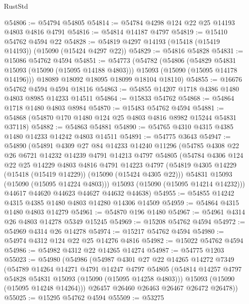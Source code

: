 \begin{lexlean}{RustStd}
\begin{coremodule}
@54806 := @54794 @54805
@54814 := @54784 @4298 @124 @22 @25 @14193 @4803 @4816 @4791
@54816 := @54814 @14187 @4797
@54819 := @15410 @54762 @4594 @22
@54828 := @54819 @4297 @14193 (@15418 (@15419 @14193)) (@15090 (@15424 @4297 @22))
@54829 := @54816 @54828
@54831 := @15086 @54762 @4594
@54851 := @54773
    (@54782
      (@54806
        (@54829 @54831 @15093 (@15090 (@15095 @14188 @4803)))
        @15093
        (@15090 (@15095 @14178 @14196)))
      @18089
      @18092
      @18095
      @18099
      @18104
      @18110)
@54855 := @16676 @54762 @4594 @4594 @18116
@54863 := @54855 @14207 @1718 @4386 @1480 @4803 @8985 @14233 @14511
@54864 := @15833 @54762
@54868 := @54864 @1718 @1480 @4803 @8984
@54870 := @15483 @54762 @4594
@54881 := @54868 (@54870 @170 @1480 @124 @25 @4803 @4816 @8982 @15244 @54831 @37118)
@54882 := @54863 @54881
@54890 := @54765 @4310 @4315 @4385 @1480 @14233 @14242 @4803 @14511
@54891 := @54775 @3643
@54947 := @54890
    (@54891
      @4309
      @27
      @84
      @14233
      @14240
      @11296
      (@54785
        @4308
        @22
        @26
        @6721
        @14232
        @14239
        @4791
        @14213
        @4797
        @54805
        (@54784
          @4306
          @124
          @22
          @25
          @14229
          @4803
          @4816
          @4791
          @14223
          @4797
          (@54819 @4305 @14229 (@15418 (@15419 @14229)) (@15090 (@15424 @4305 @22)))
          @54831
          @15093
          (@15090 (@15095 @14224 @4803)))
        @15093
        (@15090 (@15095 @14214 @14232)))
      @44617
      @44620
      @44623
      @44627
      @44632
      @44638)
@54955 := @54855 @14242 @4315 @4385 @1480 @4803 @14280 @14306 @14509
@54959 := @54864 @4315 @1480 @4803 @14279
@54961 := @54870 @196 @1480
@54967 := @54961 @4314 @26 @4803 @14278 @5349 @15245
@54969 := @15208 @54762 @4594
@54972 := @54969 @4314 @26 @14278
@54974 := @15217 @54762 @4594
@54980 := @54974 @4312 @124 @22 @25 @14276 @4816
@54982 := @15022 @54762 @4594
@54986 := @54982 @4312 @22 @14265 @14274
@54987 := @54775 @1203
@55023 := @54980
    (@54986
      (@54987
        @4301
        @27
        @22
        @14265
        @14272
        @7349
        (@54789
          @14264
          @14271
          @4791
          @14247
          @4797
          @54805
          (@54814 @14257 @4797 @54828 @54831 @15093 (@15090 (@15095 @14258 @4803)))
          @15093
          (@15090 (@15095 @14248 @14264)))
        @26457
        @26460
        @26463
        @26467
        @26472
        @26478))
@55025 := @15295 @54762 @4594
@55509 := @53275

\end{coremodule}
\end{lexlean}
